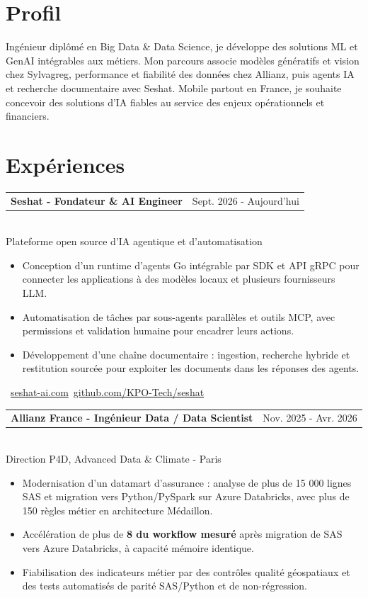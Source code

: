 \documentclass[10pt,a4paper]{article}
\makeatletter
\newcommand{\role}[3]{%
  \vspace{3pt}
  \begin{tabularx}{\linewidth}{@{}Xr@{}}
  \textbf{#1} & {\color{muted}#2}
  \end{tabularx}\vspace{0.8pt}\\
  {\color{muted}#3}\par
  \vspace{3pt}
}
\makeatother
\begin{document}
\begin{lrbox}{\maincolumnbox}
\begin{minipage}[t]{0.695\textwidth}
\vspace{0pt}
\raggedright

\section{Profil}
Ingénieur diplômé en Big Data \& Data Science, je développe des solutions ML et GenAI intégrables aux métiers. Mon parcours associe modèles génératifs et vision chez Sylvagreg, performance et fiabilité des données chez Allianz, puis agents IA et recherche documentaire avec Seshat. Mobile partout en France, je souhaite concevoir des solutions d'IA fiables au service des enjeux opérationnels et financiers.

\section{Expériences}
\role{Seshat - Fondateur \& AI Engineer}{Sept. 2026 - Aujourd'hui}{Plateforme open source d'IA agentique et d'automatisation}
\begin{itemize}
  \item Conception d'un runtime d'agents Go intégrable par SDK et API gRPC pour connecter les applications à des modèles locaux et plusieurs fournisseurs LLM.
  \item Automatisation de tâches par sous-agents parallèles et outils MCP, avec permissions et validation humaine pour encadrer leurs actions.
  \item Développement d'une chaîne documentaire : ingestion, recherche hybride et restitution sourcée pour exploiter les documents dans les réponses des agents.
\end{itemize}
{\footnotesize\color{accent}\ \href{https://seshat-ai.com}{seshat-ai.com}\enspace\textbullet\enspace{}\ \href{https://github.com/KPO-Tech/seshat}{github.com/KPO-Tech/seshat}}\par

\vspace{8pt}
\role{Allianz France - Ingénieur Data / Data Scientist}{Nov. 2025 - Avr. 2026}{Direction P4D, Advanced Data \& Climate - Paris}
\begin{itemize}
  \item Modernisation d'un datamart d'assurance : analyse de plus de 15 000 lignes SAS et migration vers Python/PySpark sur Azure Databricks, avec plus de 150 règles métier en architecture Médaillon.
  \item Accélération de plus de \textbf{8\texttimes{} du workflow mesuré} après migration de SAS vers Azure Databricks, à capacité mémoire identique.
  \item Fiabilisation des indicateurs métier par des contrôles qualité géospatiaux et des tests automatisés de parité SAS/Python et de non-régression.
\end{itemize}


\end{minipage}
\end{lrbox}
\end{document}
